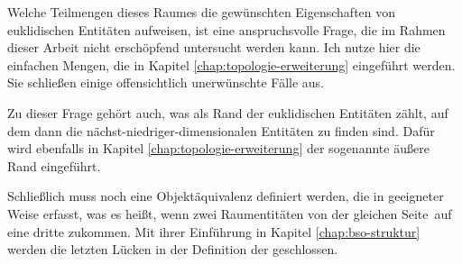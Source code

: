         Welche
        Teilmengen dieses Raumes die gewünschten Eigenschaften von euklidischen Entitäten aufweisen, ist eine anspruchsvolle Frage, die im Rahmen dieser Arbeit nicht erschöpfend untersucht werden kann.
        Ich nutze hier die einfachen Mengen, die in Kapitel \ref{chap:topologie-erweiterung} eingeführt werden.
        Sie schließen einige offensichtlich unerwünschte Fälle aus.

        Zu
        dieser Frage gehört auch, was als Rand der euklidischen Entitäten zählt, auf dem dann die nächst-niedriger-dimensionalen Entitäten zu finden sind.
        Dafür wird ebenfalls in Kapitel \ref{chap:topologie-erweiterung} der sogenannte äußere Rand eingeführt.

        Schließlich
        muss noch eine Objektäquivalenz definiert werden, die in geeigneter Weise erfasst, was es heißt, wenn zwei Raumentitäten \glqq von der gleichen Seite\grqq\ auf eine dritte zukommen.
        Mit ihrer Einführung in Kapitel \ref{chap:bso-struktur} werden die letzten Lücken in der Definition der \strukt geschlossen.
